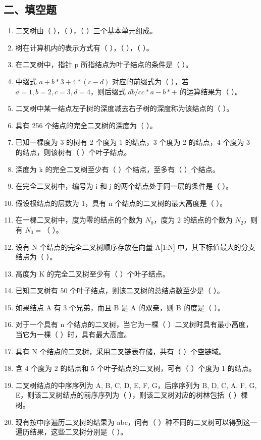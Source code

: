 \documentclass[12pt, a4paper]{article}
\begin{document}
\subsection*{二、填空题}
\begin{enumerate}
    \item 二叉树由（ ），（ ），（ ）三个基本单元组成。
    \item 树在计算机内的表示方式有（ ），（ ），（ ）。
    \item 在二叉树中，指针 p 所指结点为叶子结点的条件是（ ）。
    \item 中缀式 $a+b*3+4*(c-d)$ 对应的前缀式为（ ），若 $a=1, b=2, c=3, d=4$，则后缀式 $db/cc*a-b*+$ 的运算结果为（ ）。
    \item 二叉树中某一结点左子树的深度减去右子树的深度称为该结点的（ ）。
    \item 具有 256 个结点的完全二叉树的深度为（ ）。
    \item 已知一棵度为 3 的树有 2 个度为 1 的结点，3 个度为 2 的结点，4 个度为 3 的结点，则该树有（ ）个叶子结点。
    \item 深度为 k 的完全二叉树至少有（ ）个结点，至多有（ ）个结点。
    \item 在完全二叉树中，编号为 i 和 j 的两个结点处于同一层的条件是（ ）。
    \item 假设根结点的层数为 1，具有 n 个结点的二叉树的最大高度是（ ）。
    \item 在一棵二叉树中，度为零的结点的个数为 $N_0$，度为 2 的结点的个数为 $N_2$，则有 $N_0=$（ ）。
    \item 设有 N 个结点的完全二叉树顺序存放在向量 A[1:N] 中，其下标值最大的分支结点为（ ）。
    \item 高度为 K 的完全二叉树至少有（ ）个叶子结点。
    \item 已知二叉树有 50 个叶子结点，则该二叉树的总结点数至少是（ ）。
    \item 如果结点 A 有 3 个兄弟，而且 B 是 A 的双亲，则 B 的度是（ ）。
    \item 对于一个具有 n 个结点的二叉树，当它为一棵（ ）二叉树时具有最小高度，当它为一棵（ ）时，具有最大高度。
    \item 具有 N 个结点的二叉树，采用二叉链表存储，共有（ ）个空链域。
    \item 含 4 个度为 2 的结点和 5 个叶子结点的二叉树，可有（ ）个度为 1 的结点。
    \item 二叉树结点的中序序列为 A, B, C, D, E, F, G，后序序列为 B, D, C, A, F, G, E，则该二叉树结点的前序序列为（ ），则该二叉树对应的树林包括（ ）棵树。
    \item 现有按中序遍历二叉树的结果为 abc，问有（ ）种不同的二叉树可以得到这一遍历结果，这些二叉树分别是（ ）。

\end{enumerate}
\end{document}
